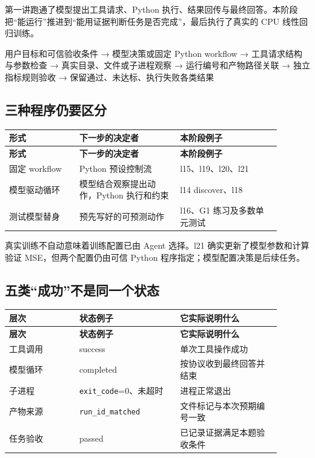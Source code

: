 \documentclass[UTF8,zihao=-4,fontset=fandol]{ctexart}
\begin{document}
第一讲跑通了模型提出工具请求、Python 执行、结果回传与最终回答。本阶段把“能运行”推进到“能用证据判断任务是否完成”，最后执行了真实的 CPU 线性回归训练。

\begin{Code}
用户目标和可信验收条件
  → 模型决策或固定 Python workflow
  → 工具请求结构与参数检查
  → 真实目录、文件或子进程观察
  → 运行编号和产物路径关联
  → 独立指标规则验收
  → 保留通过、未达标、执行失败各类结果
\end{Code}

\subsection{三种程序仍要区分}

{\small\setlength{\tabcolsep}{4pt}
\renewcommand{\arraystretch}{1.25}
\begin{longtable}{>{\raggedright\arraybackslash}p{0.23\linewidth}>{\raggedright\arraybackslash}p{0.33\linewidth}>{\raggedright\arraybackslash}p{0.33\linewidth}}
\toprule
\textbf{形式} & \textbf{下一步的决定者} & \textbf{本阶段例子} \\
\midrule\endfirsthead
\toprule
\textbf{形式} & \textbf{下一步的决定者} & \textbf{本阶段例子} \\
\midrule\endhead
\bottomrule\endfoot
固定 workflow & Python 预设控制流 & l15、l19、l20、l21 \\
模型驱动循环 & 模型结合观察提出动作，Python 执行和约束 & l14 discover、l18 \\
测试模型替身 & 预先写好的可预测动作 & l16、G1 练习及多数单元测试 \\
\end{longtable}}

真实训练不自动意味着训练配置已由 Agent 选择。l21 确实更新了模型参数和计算验证 MSE，但两个配置仍由可信 Python 程序指定；模型配置决策是后续任务。

\subsection{五类“成功”不是同一个状态}

{\small\setlength{\tabcolsep}{4pt}
\renewcommand{\arraystretch}{1.25}
\begin{longtable}{>{\raggedright\arraybackslash}p{0.23\linewidth}>{\raggedright\arraybackslash}p{0.33\linewidth}>{\raggedright\arraybackslash}p{0.33\linewidth}}
\toprule
\textbf{层次} & \textbf{状态例子} & \textbf{它实际说明什么} \\
\midrule\endfirsthead
\toprule
\textbf{层次} & \textbf{状态例子} & \textbf{它实际说明什么} \\
\midrule\endhead
\bottomrule\endfoot
工具调用 & success & 单次工具操作成功 \\
模型循环 & completed & 按协议收到最终回答并结束 \\
子进程 & \nolinkurl{exit_code}=0、未超时 & 进程正常退出 \\
产物来源 & \nolinkurl{run_id_matched} & 文件标记与本次预期编号一致 \\
任务验收 & passed & 已记录证据满足本题验收条件 \\
\end{longtable}}
\end{document}
